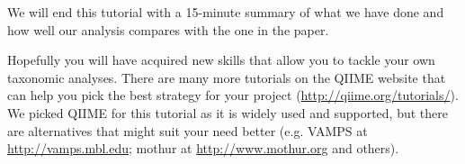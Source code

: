 We will end this tutorial with a 15-minute summary of what we have done and how well our analysis compares with the one in the paper.

Hopefully you will have acquired new skills that allow you to tackle your own taxonomic analyses. There are many more tutorials on the QIIME website that can help you pick the best strategy for your project (\url{http://qiime.org/tutorials/}). We picked QIIME for this tutorial as it is widely used and supported, but there are alternatives that might suit your need better (e.g. VAMPS at \url{http://vamps.mbl.edu}; mothur at \url{http://www.mothur.org} and others).

